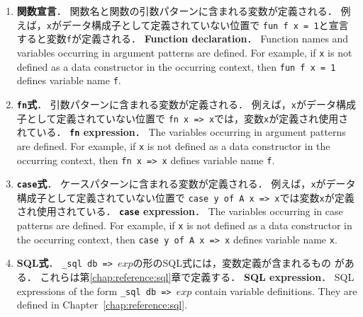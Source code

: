 \documentclass{jbook}
\newcommand{\code}[1]{\mbox{\large\tt #1}}
\begin{document}
\begin{enumerate}
\item
\ifjp%
 {\bf 関数宣言}．
	関数名と関数の引数パターンに含まれる変数が定義される．
	例えば，\code{x}がデータ構成子として定義されていない位置で
\code{fun f x = 1}と宣言すると変数\code{f}が定義される．
\else%
 {\bf Function declaration}．
	Function names and variables occurring in argument patterns are defined.
	For example, if \code{x} is not defined as a data constructor in
the occurring context, then \code{fun f x = 1} defines variable name \code{f}.
\fi%

\item
\ifjp%
 {\bf \code{fn}式}．
	引数パターンに含まれる変数が定義される．
	例えば，\code{x}がデータ構成子として定義されていない位置で
\code{fn x => x}では，変数\code{x}が定義され使用されている．
\else%
 {\bf \code{fn} expression}．
	The variables occurring in argument patterns are defined.
	For example, if \code{x} is not defined as a data constructor in
the occurring context, then \code{fn x => x} defines variable name \code{f}.
\fi%

\item
\ifjp%
 {\bf \code{case}式}．
	ケースパターンに含まれる変数が定義される．
	例えば，\code{x}がデータ構成子として定義されていない位置で
\code{case y of A x => x}では変数\code{x}が定義され使用されている．
\else%
 {\bf \code{case} expression}．
	The variables occurring in case patterns are defined.
	For example, if \code{x} is not defined as a data constructor in
the occurring context, then \code{case y of A x => x} defines variable
name \code{x}.
\fi%

\item
\ifjp%
 {\bf SQL式}．
	\code{\_sql db => $exp$}の形のSQL式には，変数定義が含まれるもの
がある．
	これらは第\ref{chap:reference:sql}章で定義する．
\else%
 {\bf SQL expression}．
	SQL expressions of the form \code{\_sql db => $exp$}
contain variable definitions.
	They are defined in Chapter~\ref{chap:reference:sql}.
\fi%
\end{enumerate}
\end{document}
